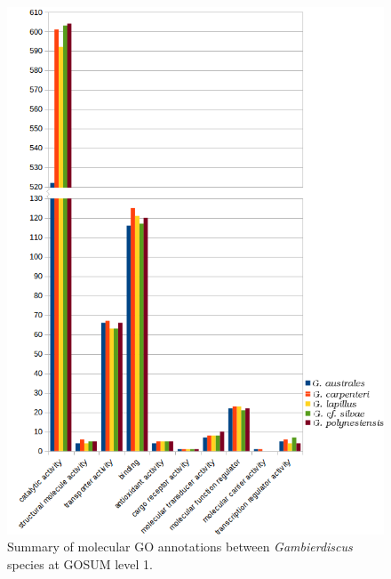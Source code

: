 \documentclass[12pt]{article}
\begin{document}
\begin{figure} 
\includegraphics[scale=1]{3Aug18_cluster-investigation/figures/gosum-species/Species-gosum1-molec-split.png} 
\caption{Summary of molecular GO annotations between \textit{Gambierdiscus} species at GOSUM level 1.}%
\label{fig:SpecGo1Molec}
\end{figure} 
\FloatBarrier
\end{document}
